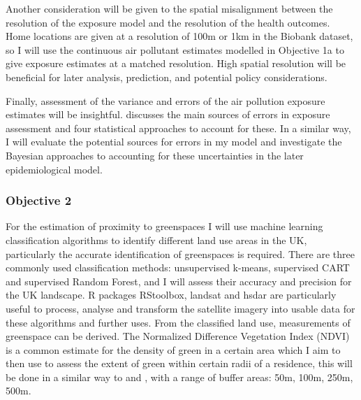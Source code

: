 Another consideration will be given to the spatial misalignment between the resolution of the exposure model and the resolution of the health outcomes. Home locations are given at a resolution of 100m or 1km in the Biobank dataset, so I will use the continuous air pollutant estimates modelled in Objective 1a to give exposure estimates at a matched resolution. High spatial resolution will be beneficial for later analysis, prediction, and potential policy considerations.

Finally, assessment of the variance and errors of the air pollution exposure estimates will be insightful. \cite{Wu2019MethodsExposures} discusses the main sources of errors in exposure assessment and four statistical approaches to account for these. In a similar way, I will evaluate the potential sources for errors in my model and investigate the Bayesian approaches to accounting for these uncertainties in the later epidemiological model.

\subsubsection{Objective 2} 
For the estimation of proximity to greenspaces I will use machine learning classification algorithms to identify different land use areas in the UK, particularly the accurate identification of greenspaces is required. There are three commonly used classification methods: unsupervised k-means, supervised CART and supervised Random Forest, and I will assess their accuracy and precision for the UK landscape. R packages RStoolbox, landsat and hsdar are particularly useful to process, analyse and transform the satellite imagery into usable data for these algorithms and further uses. From the classified land use, measurements of greenspace can be derived. The Normalized Difference Vegetation Index (NDVI) is a common estimate for the density of green in a certain area which I aim to then use to assess the extent of green within certain radii of a residence, this will be done in a similar way to \cite{Maes2021BenefitHealth} and \cite{Su2019AssociationsResolutions}, with a range of buffer areas: 50m, 100m, 250m, 500m. 

